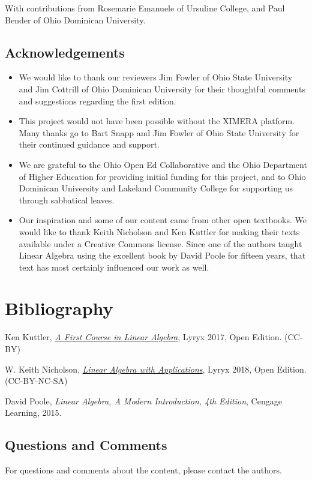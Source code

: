\documentclass{ximera}
\begin{document}
With contributions from Rosemarie Emanuele of Ursuline College, and Paul Bender of Ohio Dominican University.

\subsection{Acknowledgements}
\begin{itemize}
\item
We would like to thank our reviewers Jim Fowler of Ohio State University and Jim Cottrill of Ohio Dominican University for their thoughtful comments and suggestions regarding the first edition.  
\item This project would not have been possible without the XIMERA platform.  Many thanks go to Bart Snapp and Jim Fowler of Ohio State University for their continued guidance and support.   
\item We are grateful to the Ohio Open Ed Collaborative and the Ohio Department of Higher Education for providing initial funding for this project, and to Ohio Dominican University and Lakeland Community College for supporting us through sabbatical leaves.
\item Our inspiration and some of our content came from other open textbooks. We would like to thank Keith Nicholson and Ken Kuttler for making their texts available under a Creative Commons license.  Since one of the authors taught Linear Algebra using the excellent book by David Poole for fifteen years, that text has most certainly influenced our work as well.
\end{itemize}

\section*{Bibliography}

Ken Kuttler, \href{https://open.umn.edu/opentextbooks/textbooks/a-first-course-in-linear-algebra-2017}{\it A First Course in Linear Algebra}, Lyryx 2017, Open Edition. (CC-BY)

W. Keith Nicholson, \href{https://open.umn.edu/opentextbooks/textbooks/linear-algebra-with-applications}{\it Linear Algebra with Applications}, Lyryx 2018, Open Edition. (CC-BY-NC-SA)

David Poole, {\it Linear Algebra, A Modern Introduction, 4th Edition}, Cengage Learning, 2015.  


\subsection{Questions and Comments}
For questions and comments about the content, please contact the authors.
\end{document}
